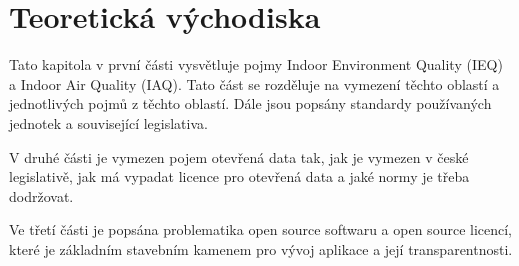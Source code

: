 \chapter{Teoretická východiska}

Tato kapitola v první části vysvětluje pojmy Indoor Environment Quality (IEQ) a Indoor Air Quality (IAQ). Tato část se rozděluje na vymezení těchto oblastí a jednotlivých pojmů z těchto oblastí. Dále jsou popsány standardy používaných jednotek a související legislativa.

V druhé části je vymezen pojem otevřená data tak, jak je vymezen v české legislativě, jak má vypadat licence pro otevřená data a jaké normy je třeba dodržovat.

Ve třetí části je popsána problematika open source softwaru a open source licencí, které je základním stavebním kamenem pro vývoj aplikace a její transparentnosti.







